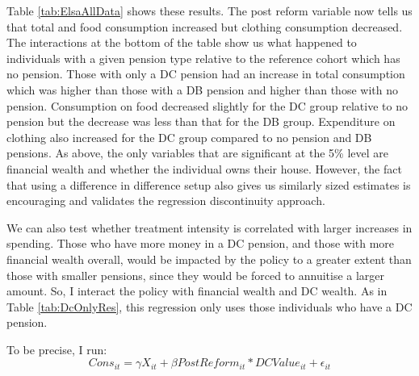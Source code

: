 \documentclass[12pt]{article}
\begin{document}
Table \ref{tab:ElsaAllData} shows these results. The post reform variable now
tells us that total and food consumption increased but clothing consumption
decreased. The interactions at the bottom of the table show us what happened to
individuals with a given pension type relative to the reference cohort which has
no pension. Those with only a DC pension had an increase in total consumption
which was higher than those with a DB pension and higher than those with no
pension. Consumption on food decreased slightly for the DC group relative to no
pension but the decrease was less than that for the DB group. Expenditure on
clothing also increased for the DC group compared to no pension and DB pensions.
As above, the only variables that are significant at the 5\% level are financial
wealth and whether the individual owns their house. However, the fact that using
a difference in difference setup also gives us similarly sized estimates is
encouraging and validates the regression discontinuity approach.

We can also test whether treatment intensity is correlated with larger increases
in spending. Those who have more money in a DC pension, and those with more
financial wealth overall, would be impacted by the policy to a greater extent
than those with smaller pensions, since they would be forced to annuitise a
larger amount. So, I interact the policy with financial wealth and DC wealth. As
in Table \ref{tab:DcOnlyRes}, this regression only uses those individuals who
have a DC pension.

To be precise, I run:
\begin{equation*}
    Cons_{it} =  \gamma X_{it} + \beta PostReform_{it}*DCValue_{it} + \epsilon_{it}
\end{equation*}

\begin{landscape}
    
\end{landscape}


\begin{landscape}
    
\end{landscape}

\begin{landscape}
    
\end{landscape}

\begin{landscape}
    
\end{landscape}
\end{document}
